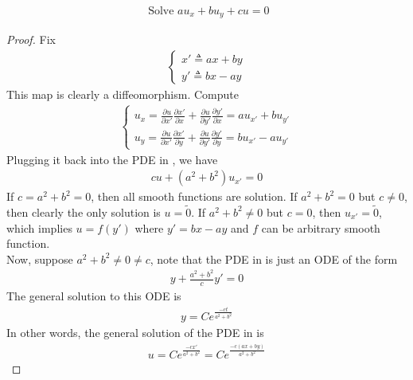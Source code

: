 \documentclass{report}
\begin{document}
\begin{theorem}
\begin{align}
\label{he2}
\text{ Solve }au_x+b u_y +cu=0
\end{align}
\end{theorem}
\begin{proof}
Fix 
\begin{align*}
\begin{cases}
  x'\triangleq ax+by \\
  y'\triangleq bx-ay
\end{cases}
\end{align*}
This map is clearly a diffeomorphism. Compute 
\begin{align*}
  \begin{cases}
    u_x= \frac{\partial u}{\partial x'}\frac{\partial x'}{\partial x}+\frac{\partial u}{\partial y'}\frac{\partial y'}{\partial x}=au_{x'}+bu_{y'}\\
    u_y=\frac{\partial u}{\partial x'}\frac{\partial x'}{\partial y}+\frac{\partial u}{\partial y'}\frac{\partial y'}{\partial y}=bu_{x'}-au_{y'}
  \end{cases}
\end{align*}
Plugging it back into the PDE in , we have 
\begin{align}
\label{he3}
cu+ (a^2+b^2)u_{x'}=0
\end{align}
If $c=a^2+b^2=0$, then all smooth functions are solution. If $a^2+b^2=0$ but $c\neq 0$, then clearly the only solution is $u=\tilde{0} $. If $a^2+b^2\neq 0$ but $c=0$, then $u_{x'}=\tilde{0}$, which implies $u=f(y')$ where $y'=bx-ay$ and  $f$ can be arbitrary smooth function.\\

Now, suppose $a^2+b^2\neq 0\neq c$, note that the PDE in  is just an ODE of the form 
\begin{align*}
y+\frac{a^2+b^2}{c}y'=0
\end{align*}
The general solution to this ODE is 
\begin{align*}
y=Ce^{\frac{-ct}{a^2+b^2}}
\end{align*}
In other words, the general solution of the PDE in  is 
\begin{align*}
u=C e^{\frac{-cx'}{a^2+b^2}}=Ce^{\frac{-c(ax+by)}{a^2+b^2}}
\end{align*}


\end{proof}
\end{document}
